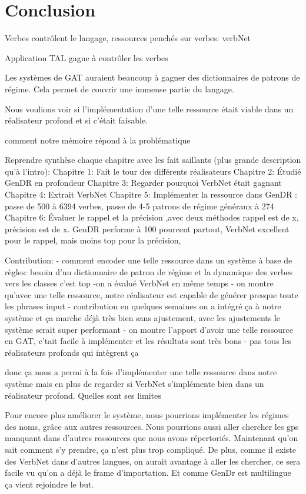 
\chapter*{Conclusion}

Verbes contrôlent le langage, ressources penchés sur verbes: verbNet

Application TAL gagne à contrôler les verbes

Les systèmes de GAT auraient beaucoup à gagner des dictionnaires de patrons de régime. Cela permet de couvrir une immense partie du langage.

Nous voulions voir si l'implémentation d'une telle ressource était viable dans un réalisateur profond et si c'était faisable.

comment notre mémoire répond à la problématique

Reprendre synthèse chaque chapitre avec les fait saillants (plus grande description qu'à l'intro):
Chapitre 1: Fait le tour des différents réalisateurs
Chapitre 2: Étudié GenDR en profondeur
Chapitre 3: Regarder pourquoi VerbNet était gagnant
Chapitre 4: Extrait VerbNet
Chapitre 5: Implémenter la ressource dans GenDR : passe de 500 à 6394 verbes, passe de 4-5 patrons de régime généraux à 274	
Chapitre 6: Évaluer le rappel et la précision ,avec deux méthodes rappel est de x, précision est de x. GenDR performe à 100 pourcent partout, VerbNet excellent pour le rappel, mais moins top pour la précision, 

Contribution:
- comment encoder une telle ressource dans un système à base de règles: besoin d'un dictionnaire de patron de régime et la dynamique des verbes vers les classes c'est top
-on a évalué VerbNet en même temps
- on montre qu'avec une telle ressource, notre réalisateur est capable de générer presque toute les phrases input
- contribution en quelques semaines on a intégré ça à notre système et ça marche déjà très bien sans ajustement, avec les ajustements le système serait super performant
- on montre l'apport d'avoir une telle ressource en GAT, c'tait facile à implémenter et les résultats sont très bons
- pas tous les réalisateurs profonds qui intègrent ça

donc ça nous a permi à la fois d'implémenter une telle ressource dans notre système mais en plus de regarder si VerbNet s'implémente bien dans un réalisateur profond. Quelles sont ses limites

Pour encore plus améliorer le système, nous pourrions implémenter les régimes des noms, grâce aux autres ressources. Nous pourrions aussi aller chercher les gps manquant dans d'autres ressources que nous avons répertoriés. Maintenant qu'on sait comment s'y prendre, ça n'est plus trop compliqué. De plus, comme il existe des VerbNet dans d'autres langues, on aurait avantage à aller les chercher, ce sera facile vu qu'on a déjà le frame d'importation. Et comme GenDr est multilingue ça vient rejoindre le but.


